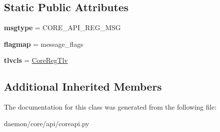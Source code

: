 \subsection*{Static Public Attributes}
\begin{DoxyCompactItemize}
\item 
\hypertarget{classcore_1_1api_1_1coreapi_1_1_core_reg_message_a13a6320cc3f5b7dc9a659628c1c45886}{{\bfseries msgtype} = C\+O\+R\+E\+\_\+\+A\+P\+I\+\_\+\+R\+E\+G\+\_\+\+M\+S\+G}\label{classcore_1_1api_1_1coreapi_1_1_core_reg_message_a13a6320cc3f5b7dc9a659628c1c45886}

\item 
\hypertarget{classcore_1_1api_1_1coreapi_1_1_core_reg_message_a8f1b93c6b5562f13ccdf7249a1aef1b6}{{\bfseries flagmap} = message\+\_\+flags}\label{classcore_1_1api_1_1coreapi_1_1_core_reg_message_a8f1b93c6b5562f13ccdf7249a1aef1b6}

\item 
\hypertarget{classcore_1_1api_1_1coreapi_1_1_core_reg_message_aee1c0e6d862aeb432e0e2138a679d2bc}{{\bfseries tlvcls} = \hyperlink{classcore_1_1api_1_1coreapi_1_1_core_reg_tlv}{Core\+Reg\+Tlv}}\label{classcore_1_1api_1_1coreapi_1_1_core_reg_message_aee1c0e6d862aeb432e0e2138a679d2bc}

\end{DoxyCompactItemize}
\subsection*{Additional Inherited Members}


The documentation for this class was generated from the following file\+:\begin{DoxyCompactItemize}
\item 
daemon/core/api/coreapi.\+py\end{DoxyCompactItemize}
